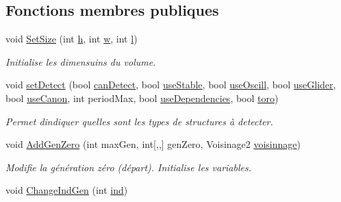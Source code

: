 \subsection*{Fonctions membres publiques}
\begin{DoxyCompactItemize}
\item 
void \mbox{\hyperlink{class_detection_a43ce2bcef47db14aa4a5a2ff39fee974}{Set\+Size}} (int \mbox{\hyperlink{class_detection_ae2432d029788c3aa58e832716a7832e4}{h}}, int \mbox{\hyperlink{class_detection_a15fdbc0a47657ec7c4bf5228a950079d}{w}}, int \mbox{\hyperlink{class_detection_a22ac4a8c7bfff75ddde6599e2868383d}{l}})
\begin{DoxyCompactList}\small\item\em Initialise les dimensuins du volume. \end{DoxyCompactList}\item 
void \mbox{\hyperlink{class_detection_a31fe39fdfc2f5b8c9e92bcfe1c5d6cc0}{set\+Detect}} (bool \mbox{\hyperlink{class_detection_a699901c5a7439b08e8ac5c36942bb61b}{can\+Detect}}, bool \mbox{\hyperlink{class_detection_a78bb8c89cca9479bb2bb4ef0f5e96945}{use\+Stable}}, bool \mbox{\hyperlink{class_detection_a9597ce1e1dea98c61902d891c1f1c7e0}{use\+Oscill}}, bool \mbox{\hyperlink{class_detection_af1181c7a5cdf8fe0f94e2e6526a1ffb1}{use\+Glider}}, bool \mbox{\hyperlink{class_detection_a3fe2d8aec9ad4e2a8f11902ba873db52}{use\+Canon}}, int period\+Max, bool \mbox{\hyperlink{class_detection_abe71ec7aa825173786fd273323343c11}{use\+Dependencies}}, bool \mbox{\hyperlink{class_detection_a2f87015f257584e33ceacc6d326fe5af}{toro}})
\begin{DoxyCompactList}\small\item\em Permet d\textquotesingle{}indiquer quelles sont les types de structures à detecter. \end{DoxyCompactList}\item 
void \mbox{\hyperlink{class_detection_a96c6d9a8e299f137a4fb84d2ea80e092}{Add\+Gen\+Zero}} (int max\+Gen, int\mbox{[},,\mbox{]} gen\+Zero, Voisinage2 \mbox{\hyperlink{class_detection_a6f99794fd28f6f79dedfc541f8b78154}{voisinnage}})
\begin{DoxyCompactList}\small\item\em Modifie la génération zéro (départ). Initialise les variables. \end{DoxyCompactList}\item 
void \mbox{\hyperlink{class_detection_a70084049883e8e2ebecce5d24e84a196}{Change\+Ind\+Gen}} (int \mbox{\hyperlink{class_detection_ac2c7885d3e4d086504e66eb365207c1e}{ind}})

\end{DoxyCompactItemize}
